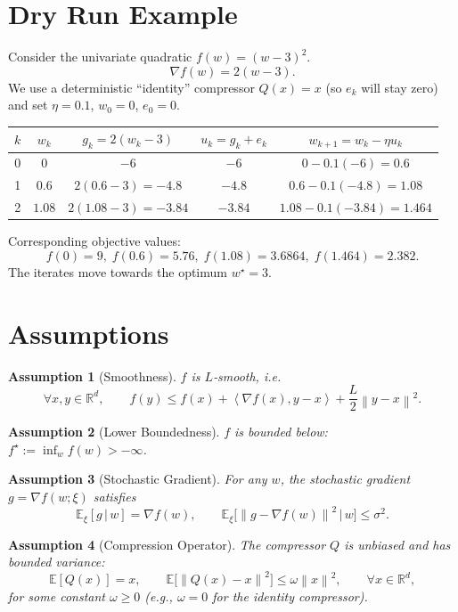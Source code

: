 \documentclass{article}
\newtheorem{assumption}{Assumption}
\newcommand{\E}{\mathbb{E}}
\newcommand{\norm}[1]{\left\lVert#1\right\rVert}
\newcommand{\ip}[2]{\left\langle#1,#2\right\rangle}
\begin{document}
\section*{Dry Run Example}
Consider the univariate quadratic $f(w)=(w-3)^2$.
\[
\nabla f(w)=2(w-3).
\]
We use a deterministic ``identity'' compressor $Q(x)=x$ (so $e_k$ will stay zero) and set $\eta=0.1$, $w_0=0$, $e_0=0$.

\begin{center}
\begin{tabular}{c|c|c|c|c}
$k$ & $w_k$ & $g_k=2(w_k-3)$ & $u_k=g_k+e_k$ & $w_{k+1}=w_k-\eta u_k$\\\hline
0 & $0$ & $-6$ & $-6$ & $0-0.1(-6)=0.6$\\
1 & $0.6$ & $2(0.6-3)=-4.8$ & $-4.8$ & $0.6-0.1(-4.8)=1.08$\\
2 & $1.08$ & $2(1.08-3)=-3.84$ & $-3.84$ & $1.08-0.1(-3.84)=1.464$\\
\end{tabular}
\end{center}
Corresponding objective values:
\[
f(0)=9,\; f(0.6)=5.76,\; f(1.08)=3.6864,\; f(1.464)=2.382.
\]
The iterates move towards the optimum $w^\star=3$.

\newpage
\section*{Assumptions}
\begin{assumption}[Smoothness]\label{as:smooth}
$f$ is $L$‑smooth, i.e.
\[
\forall x,y\in\mathbb{R}^d,\qquad
f(y)\le f(x)+\ip{\nabla f(x)}{y-x}+\frac{L}{2}\norm{y-x}^2 .
\]
\end{assumption}

\begin{assumption}[Lower Boundedness]\label{as:lower}
$f$ is bounded below: $f^\star:=\inf_{w}f(w)>-\infty$.
\end{assumption}

\begin{assumption}[Stochastic Gradient]\label{as:stoch}
For any $w$, the stochastic gradient $g=\nabla f(w;\xi)$ satisfies
\[
\E_{\xi}[g\,|\,w]=\nabla f(w),\qquad 
\E_{\xi}\big[\norm{g-\nabla f(w)}^2\,\big|\,w\big]\le\sigma^2 .
\]
\end{assumption}

\begin{assumption}[Compression Operator]\label{as:compress}
The compressor $Q$ is \emph{unbiased} and has bounded variance:
\[
\E[Q(x)]=x,\qquad 
\E\!\big[\norm{Q(x)-x}^2\big]\le\omega\norm{x}^2,\qquad\forall x\in\mathbb{R}^d,
\]
for some constant $\omega\ge0$ (e.g., $\omega=0$ for the identity compressor).
\end{assumption}
\end{document}
